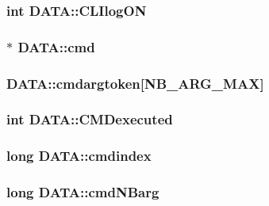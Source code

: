 \subsubsection[{C\+L\+Ilog\+O\+N}]{\setlength{\rightskip}{0pt plus 5cm}int D\+A\+T\+A\+::\+C\+L\+Ilog\+O\+N}\label{structDATA_abfc40a5bf0093716bcc793aca3ec678c}
\hypertarget{structDATA_af0e58ce879fa3017d9131eed5a90cc96}{}
\subsubsection[{cmd}]{$\ast$ D\+A\+T\+A\+::cmd}\label{structDATA_af0e58ce879fa3017d9131eed5a90cc96}
\hypertarget{structDATA_a1072fcd97dbe8660a3b3d7d54b21b300}{}
\subsubsection[{cmdargtoken}]{ D\+A\+T\+A\+::cmdargtoken\mbox{[}{\bf N\+B\+\_\+\+A\+R\+G\+\_\+\+M\+A\+X}\mbox{]}}\label{structDATA_a1072fcd97dbe8660a3b3d7d54b21b300}
\hypertarget{structDATA_a51e21d55f2eeba8ae6c9f9f02311eeef}{}
\subsubsection[{C\+M\+Dexecuted}]{\setlength{\rightskip}{0pt plus 5cm}int D\+A\+T\+A\+::\+C\+M\+Dexecuted}\label{structDATA_a51e21d55f2eeba8ae6c9f9f02311eeef}
\hypertarget{structDATA_af462cdcbd42307c3dacf0891ba4dd8ca}{}
\subsubsection[{cmdindex}]{\setlength{\rightskip}{0pt plus 5cm}long D\+A\+T\+A\+::cmdindex}\label{structDATA_af462cdcbd42307c3dacf0891ba4dd8ca}
\hypertarget{structDATA_a6facd114f508ec4fcb52003b9f93d123}{}
\subsubsection[{cmd\+N\+Barg}]{\setlength{\rightskip}{0pt plus 5cm}long D\+A\+T\+A\+::cmd\+N\+Barg}\label{structDATA_a6facd114f508ec4fcb52003b9f93d123}
\hypertarget{structDATA_a8148a9459923d124f03989f0c796e137}{}
